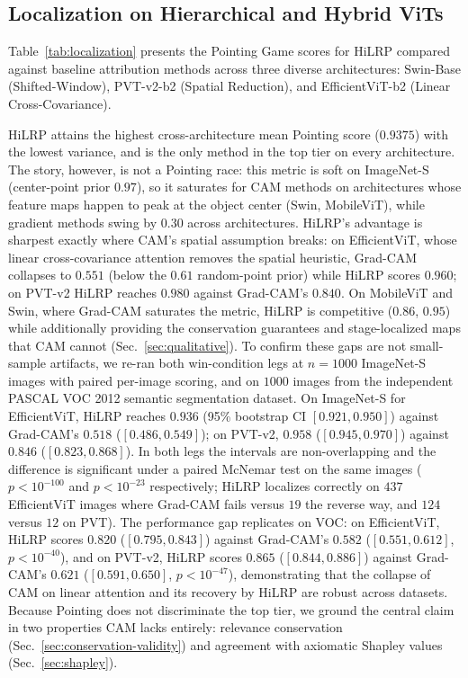\documentclass[lettersize,journal]{IEEEtran}
\begin{document}
\subsection{Localization on Hierarchical and Hybrid ViTs}
\label{sec:localization}
Table~\ref{tab:localization} presents the Pointing Game scores for HiLRP compared against baseline attribution methods across three diverse architectures: Swin-Base (Shifted-Window), PVT-v2-b2 (Spatial Reduction), and EfficientViT-b2 (Linear Cross-Covariance).

HiLRP attains the highest cross-architecture mean Pointing score ($0.9375$) with the lowest variance, and is the only method in the top tier on every architecture. The story, however, is not a Pointing race: this metric is soft on ImageNet-S (center-point prior $0.97$), so it saturates for CAM methods on architectures whose feature maps happen to peak at the object center (Swin, MobileViT), while gradient methods swing by $0.30$ across architectures. HiLRP's advantage is sharpest exactly where CAM's spatial assumption breaks: on EfficientViT, whose linear cross-covariance attention removes the spatial heuristic, Grad-CAM collapses to $0.551$ (below the $0.61$ random-point prior) while HiLRP scores $0.960$; on PVT-v2 HiLRP reaches $0.980$ against Grad-CAM's $0.840$. On MobileViT and Swin, where Grad-CAM saturates the metric, HiLRP is competitive ($0.86$, $0.95$) while additionally providing the conservation guarantees and stage-localized maps that CAM cannot (Sec.~\ref{sec:qualitative}). To confirm these gaps are not small-sample artifacts, we re-ran both win-condition legs at $n{=}1000$ ImageNet-S images with paired per-image scoring, and on $1000$ images from the independent PASCAL VOC 2012 semantic segmentation dataset. On ImageNet-S for EfficientViT, HiLRP reaches $0.936$ (95\% bootstrap CI $[0.921,0.950]$) against Grad-CAM's $0.518$ ($[0.486,0.549]$); on PVT-v2, $0.958$ ($[0.945,0.970]$) against $0.846$ ($[0.823,0.868]$). In both legs the intervals are non-overlapping and the difference is significant under a paired McNemar test on the same images ($p<10^{-100}$ and $p<10^{-23}$ respectively; HiLRP localizes correctly on $437$ EfficientViT images where Grad-CAM fails versus $19$ the reverse way, and $124$ versus $12$ on PVT). The performance gap replicates on VOC: on EfficientViT, HiLRP scores $0.820$ ($[0.795,0.843]$) against Grad-CAM's $0.582$ ($[0.551,0.612]$, $p<10^{-40}$), and on PVT-v2, HiLRP scores $0.865$ ($[0.844,0.886]$) against Grad-CAM's $0.621$ ($[0.591,0.650]$, $p<10^{-47}$), demonstrating that the collapse of CAM on linear attention and its recovery by HiLRP are robust across datasets. Because Pointing does not discriminate the top tier, we ground the central claim in two properties CAM lacks entirely: relevance conservation (Sec.~\ref{sec:conservation-validity}) and agreement with axiomatic Shapley values (Sec.~\ref{sec:shapley}).
\end{document}
